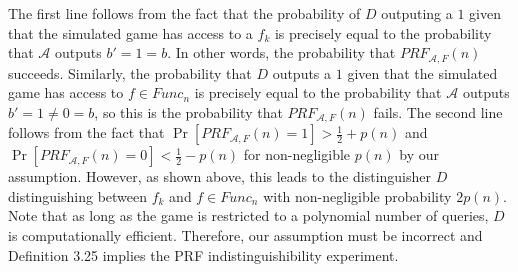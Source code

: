 \documentclass{article}
\begin{document}
\begin{enumerate}
The first line follows from the fact that the probability of $D$ outputing a $1$ given that the 
simulated game has access to a $f_k$ is precisely equal to the probability that $\mathcal{A}$
outputs $b' = 1 = b$. In other words, the probability that $PRF_{\mathcal{A},F}(n)$ succeeds.
Similarly, the probability that $D$ outputs a $1$ given that the 
simulated game has access to $f \in Func_n$ is precisely equal to the probability that $\mathcal{A}$
outputs $b' = 1 \neq 0 = b$, so this is the probability that $PRF_{\mathcal{A},F}(n)$ fails. The 
second line follows from the fact that $\Pr[PRF_{\mathcal{A},F}(n) = 1] > \frac{1}{2} + p(n)$ and 
$\Pr[PRF_{\mathcal{A},F}(n) = 0] < \frac{1}{2} - p(n)$ for non-negligible $p(n)$ by our assumption.
However, as shown above, this leads to the distinguisher $D$ distinguishing between $f_k$ and
$f \in Func_n$ with non-negligible probability $2p(n)$. Note that as long as the game is 
restricted to a polynomial number of queries, $D$ is computationally efficient. Therefore, 
our assumption must be incorrect and Definition 3.25 implies the PRF indistinguishibility experiment.%


\end{enumerate}
\end{document}
